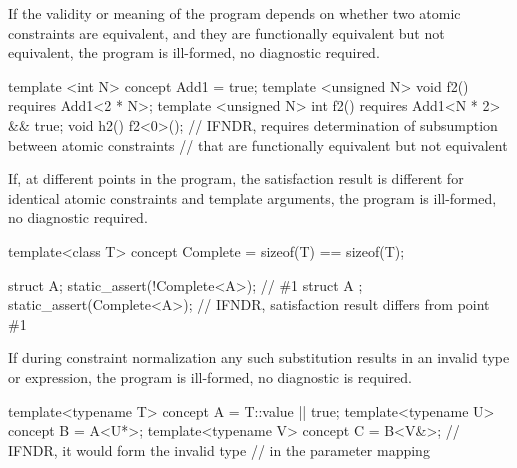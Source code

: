 
\pnum
If the validity or meaning of the program
depends on whether two atomic constraints are equivalent,
and they are functionally equivalent but not equivalent,
the program is ill-formed, no diagnostic required.

\pnum
\begin{example}
\begin{codeblock}
template <int N> concept Add1 = true;
template <unsigned N> void f2()
requires Add1<2 * N>;
template <unsigned N> int f2()
requires Add1<N * 2> && true;
void h2() {
f2<0>();        // IFNDR, requires determination of subsumption between atomic constraints
                // that are functionally equivalent but not equivalent
}
\end{codeblock}
\end{example}


\pnum
If, at different points in the program,
the satisfaction result is different
for identical atomic constraints and template arguments,
the program is ill-formed, no diagnostic required.

\pnum
\begin{example}
\begin{codeblock}
template<class T>
concept Complete = sizeof(T) == sizeof(T);

struct A;
static_assert(!Complete<A>);    // \#1
struct A {};
static_assert(Complete<A>);     // IFNDR, satisfaction result differs from point \#1
\end{codeblock}
\end{example}


\pnum
If during constraint normalization
any such substitution results in an invalid type or expression,
the program is ill-formed, no diagnostic is required.

\pnum
\begin{example}
\begin{codeblock}
template<typename T> concept A = T::value || true;
template<typename U> concept B = A<U*>;
template<typename V> concept C = B<V&>;         // IFNDR, it would form the invalid type 
                                                // in the parameter mapping
\end{codeblock}
\end{example}

